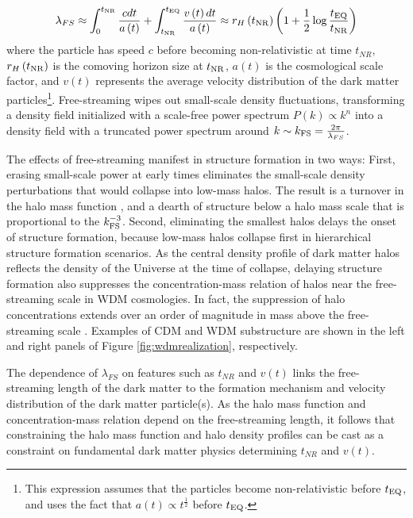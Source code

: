 \begin{equation}
\label{eqn:freestreaming}
\lambda_{FS} \approx \int_{0}^{t_{\rm{NR}}} \frac{c dt}{a\left(t\right)} +  \int_{t_{\rm{NR}}}^{t_{\rm{EQ}}} \frac{v\left(t\right) dt}{a\left(t\right)} \approx r_{H}\left(t_{\rm{NR}}\right) \left(1 +\frac{1}{2} \log \frac{t_{\rm{EQ}}}{t_{\rm{NR}}} \right)
\end{equation}
where the particle has speed $c$ before becoming non-relativistic at time $t_{NR}$, $r_H \left(t_{\rm{NR}}\right)$ is the comoving horizon size at $t_{\rm{NR}}$, $a\left(t\right)$ is the cosmological scale factor, and $v\left(t\right)$ represents the average velocity distribution of the dark matter particles\footnote{This expression assumes that the particles become non-relativistic before $t_{\rm{EQ}}$, and uses the fact that $a\left(t\right)\propto t^{\frac{1}{2}}$ before $t_{\rm{EQ}}$.}. Free-streaming wipes out small-scale density fluctuations, transforming a density field initialized with a scale-free power spectrum $P\left(k\right) \propto k^{n}$ into a density field with a truncated power spectrum around $k \sim k_{\rm{FS}} = \frac{2 \pi}{\lambda_{FS}}$. 

The effects of free-streaming manifest in structure formation in two ways: First, erasing small-scale power at early times eliminates the small-scale density perturbations that would collapse into low-mass halos. The result is a turnover in the halo mass function \cite{AvilaReese++01,Schneider++12,Lovell++14}, and a dearth of structure below a halo mass scale that is proportional to the $k_{\rm{FS}}^{-3}$. Second, eliminating the smallest halos delays the onset of structure formation, because low-mass halos collapse first in hierarchical structure formation scenarios. As the central density profile of dark matter halos reflects the density of the Universe at the time of collapse, delaying structure formation also suppresses the concentration-mass relation of halos near the free-streaming scale in WDM cosmologies. In fact, the suppression of halo concentrations extends over an order of magnitude in mass above the free-streaming scale \cite{Navarro++96,Bose++16}. Examples of CDM and WDM substructure are shown in the left and right panels of Figure \ref{fig:wdmrealization}, respectively. 

The dependence of $\lambda_{FS}$ on features such as $t_{NR}$ and $v\left(t\right)$ links the free-streaming length of the dark matter to the formation mechanism and velocity distribution of the dark matter particle(s). As the halo mass function and concentration-mass relation depend on the free-streaming length, it follows that constraining the halo mass function and halo density profiles can be cast as a constraint on fundamental dark matter physics determining $t_{NR}$ and $v\left(t\right)$. 

